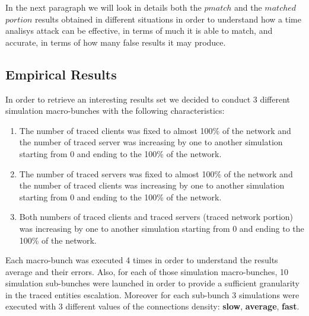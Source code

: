 In the next paragraph we will look in details both the $pmatch$ and the
$matched$ $portion$
results obtained in different situations in order to understand how a
time analisys attack can be effective, in terms of much it is able to match,
and accurate, in terms of how many false results it may produce.

\newpage
\subsection{Empirical Results}

In order to retrieve an interesting results set we decided to conduct
3 different simulation macro-bunches with the following characteristics:
\begin{enumerate}
	\item The number of traced clients was fixed to almost 100\% of the
network and the number of traced server was increasing by one to another
simulation starting from 0 and ending to the 100\% of the network.
	\item The number of traced servers was fixed to almost 100\% of the
network and the number of traced clients was increasing by one to another
simulation starting from 0 and ending to the 100\% of the network.
	\item Both numbers of traced clients and traced servers (traced
network portion) was increasing by one to another
simulation starting from 0 and ending to the 100\% of the network.
\end{enumerate}

Each macro-bunch was executed 4 times in order to understand the results
average and their errors. 
Also, for each of those simulation macro-bunches, 10 simulation sub-bunches were
launched in order to provide a sufficient granularity in the traced
entities escalation. Moreover for each sub-bunch 3 simulations were
executed with 3 different values of the connections density: \textbf{slow},
\textbf{average}, \textbf{fast}. %

